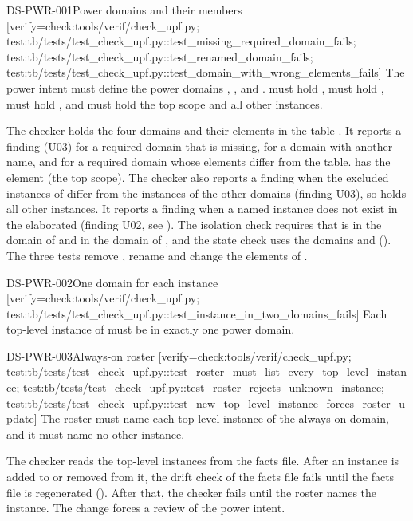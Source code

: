 \begin{requirement}{DS-PWR-001}{Power domains and their members}
[verify={check:tools/verif/check_upf.py; test:tb/tests/test_check_upf.py::test_missing_required_domain_fails; test:tb/tests/test_check_upf.py::test_renamed_domain_fails; test:tb/tests/test_check_upf.py::test_domain_with_wrong_elements_fails}]
The power intent must define the power domains , ,  and .  must hold ,  must hold ,  must hold , and  must hold the top scope and all other instances.
\end{requirement}
\begin{information}
The checker holds the four domains and their elements in the table . It reports a finding (U03) for a required domain that is missing, for a domain with another name, and for a required domain whose elements differ from the table.  has the element  (the top scope). The checker also reports a finding when the excluded instances of  differ from the instances of the other domains (finding U03), so  holds all other instances. It reports a finding when a named instance does not exist in the elaborated  (finding U02, see ). The isolation check requires that  is in the domain of  and  in the domain of , and the state check uses the domains  and  (). The three tests remove , rename  and change the elements of .
\end{information}

\begin{requirement}{DS-PWR-002}{One domain for each instance}
[verify={check:tools/verif/check_upf.py; test:tb/tests/test_check_upf.py::test_instance_in_two_domains_fails}]
Each top-level instance of  must be in exactly one power domain.
\end{requirement}

\begin{requirement}{DS-PWR-003}{Always-on roster}
[verify={check:tools/verif/check_upf.py; test:tb/tests/test_check_upf.py::test_roster_must_list_every_top_level_instance; test:tb/tests/test_check_upf.py::test_roster_rejects_unknown_instance; test:tb/tests/test_check_upf.py::test_new_top_level_instance_forces_roster_update}]
The roster must name each top-level instance of the always-on domain, and it must name no other instance.
\end{requirement}
\begin{information}
The checker reads the top-level instances from the facts file. After an instance is added to  or removed from it, the drift check of the facts file fails until the facts file is regenerated (). After that, the checker fails until the roster names the instance. The change forces a review of the power intent.
\end{information}

